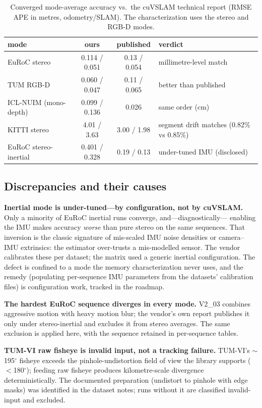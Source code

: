 \begin{table}[t]
\centering
\caption{Converged mode-average accuracy vs.\ the cuVSLAM technical report
(RMSE APE in metres, odometry/SLAM). The characterization uses the stereo
and RGB-D modes.}
\label{tab:accuracy}
\begin{tabular}{@{}lccl@{}}
\toprule
mode & ours & published & verdict \\
\midrule
EuRoC stereo & 0.114 / 0.051 & 0.13 / 0.054 & millimetre-level match \\
TUM RGB-D & 0.060 / 0.047 & 0.11 / 0.065 & better than published \\
ICL-NUIM (mono-depth) & 0.099 / 0.136 & 0.026 & same order (cm) \\
KITTI stereo & 4.01 / 3.63 & 3.00 / 1.98 & segment drift matches
(0.82\% vs 0.85\%) \\
EuRoC stereo-inertial & 0.401 / 0.328 & 0.19 / 0.13 & under-tuned IMU
(disclosed) \\
\bottomrule
\end{tabular}
\end{table}

\subsection{Discrepancies and their causes}
\label{sec:val-discrepancies}

\textbf{Inertial mode is under-tuned---by configuration, not by cuVSLAM.}
Only a minority of EuRoC inertial runs converge, and---diagnostically---
enabling the IMU makes accuracy \emph{worse} than pure stereo on the same
sequences. That inversion is the classic signature of mis-scaled IMU noise
densities or camera--IMU extrinsics: the estimator over-trusts a mis-modelled
sensor. The vendor calibrates these per dataset; the matrix used a generic
inertial configuration. The defect is confined to a mode the memory
characterization never uses, and the remedy (populating per-sequence IMU
parameters from the datasets' calibration files) is configuration work,
tracked in the roadmap.

\textbf{The hardest EuRoC sequence diverges in every mode.} V2\_03 combines
aggressive motion with heavy motion blur; the vendor's own report publishes
it only under stereo-inertial and excludes it from stereo averages. The same
exclusion is applied here, with the sequence retained in per-sequence
tables.

\textbf{TUM-VI raw fisheye is invalid input, not a tracking failure.}
TUM-VI's $\sim$195$^\circ$ fisheye exceeds the pinhole-undistortion field of
view the library supports ($<$180$^\circ$); feeding raw fisheye produces
kilometre-scale divergence deterministically. The documented preparation
(undistort to pinhole with edge masks) was identified in the dataset notes;
runs without it are classified invalid-input and excluded.

